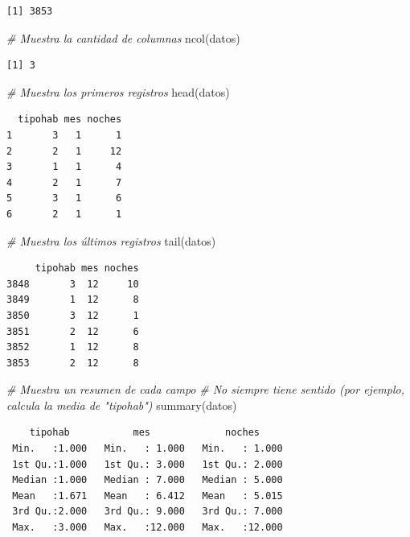 \documentclass[
]{book}
\newenvironment{Shaded}{\begin{snugshade}}{\end{snugshade}}
\newcommand{\CommentTok}[1]{\textcolor[rgb]{0.56,0.35,0.01}{\textit{#1}}}
\newcommand{\FunctionTok}[1]{\textcolor[rgb]{0.00,0.00,0.00}{#1}}
\newcommand{\NormalTok}[1]{#1}
\begin{document}
\begin{verbatim}
[1] 3853
\end{verbatim}

\begin{Shaded}
\begin{Highlighting}[]
\CommentTok{\# Muestra la cantidad de columnas}
\FunctionTok{ncol}\NormalTok{(datos)}
\end{Highlighting}
\end{Shaded}

\begin{verbatim}
[1] 3
\end{verbatim}

\begin{Shaded}
\begin{Highlighting}[]
\CommentTok{\# Muestra los primeros registros}
\FunctionTok{head}\NormalTok{(datos)}
\end{Highlighting}
\end{Shaded}

\begin{verbatim}
  tipohab mes noches
1       3   1      1
2       2   1     12
3       1   1      4
4       2   1      7
5       3   1      6
6       2   1      1
\end{verbatim}

\begin{Shaded}
\begin{Highlighting}[]
\CommentTok{\# Muestra los últimos registros}
\FunctionTok{tail}\NormalTok{(datos)}
\end{Highlighting}
\end{Shaded}

\begin{verbatim}
     tipohab mes noches
3848       3  12     10
3849       1  12      8
3850       3  12      1
3851       2  12      6
3852       1  12      8
3853       2  12      8
\end{verbatim}

\begin{Shaded}
\begin{Highlighting}[]
\CommentTok{\# Muestra un resumen de cada campo}
\CommentTok{\# No siempre tiene sentido (por ejemplo, calcula la media de "tipohab")}
\FunctionTok{summary}\NormalTok{(datos)}
\end{Highlighting}
\end{Shaded}

\begin{verbatim}
    tipohab           mes             noches      
 Min.   :1.000   Min.   : 1.000   Min.   : 1.000  
 1st Qu.:1.000   1st Qu.: 3.000   1st Qu.: 2.000  
 Median :1.000   Median : 7.000   Median : 5.000  
 Mean   :1.671   Mean   : 6.412   Mean   : 5.015  
 3rd Qu.:2.000   3rd Qu.: 9.000   3rd Qu.: 7.000  
 Max.   :3.000   Max.   :12.000   Max.   :12.000  
\end{verbatim}
\end{document}
